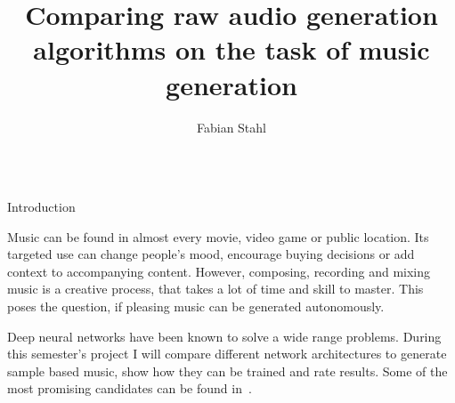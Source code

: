 \documentclass[final,hyperref={pdfpagelabels=false}]{beamer}
\title{
Comparing raw audio generation algorithms on the task of music generation
} %
\author{%
Fabian Stahl
} %
\institute{%
Hochschule RheinMain University of Applied Sciences, Wiesbaden
} %
\newcommand{\blocktextwidth}{0.93\textwidth}
\begin{document}
\begin{frame}[t] %

\begin{columns}[t] %


\begin{column}{.31\textwidth} %


{


\vspace{1.11em}

\begin{block}{Introduction}
\begin{minipage}[]{\blocktextwidth}

Music can be found in almost every movie, video game or public location.
Its targeted use can change people's mood, encourage buying decisions or add context to accompanying content.
However, composing, recording and mixing music is a creative process, that takes a lot of time and skill to master.
This poses the question, if pleasing music can be generated autonomously.

Deep neural networks have been known to solve a wide range problems.
During this semester's project I will compare different network architectures to generate sample based music, show how they can be trained and rate results.
Some of the most promising candidates can be found in~\cite{deepsound}.

\end{minipage}
\end{block}
}

\vspace{2em}


\end{column}
\end{columns}
\end{frame}
\end{document}
